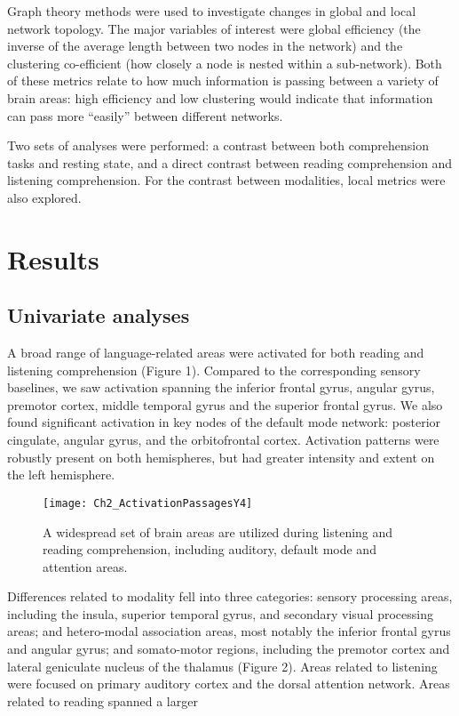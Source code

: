 Graph theory methods were used to investigate changes in global and local network topology. The major variables of interest were global efficiency (the inverse of the average length between two nodes in the network) and the clustering co-efficient (how closely a node is nested within a sub-network). Both of these metrics relate to how much information is passing between a variety of brain areas: high efficiency and low clustering would indicate that information can pass more “easily” between different networks. 

Two sets of analyses were performed: a contrast between both comprehension tasks and resting state, and a direct contrast between reading comprehension and listening comprehension. For the contrast between modalities, local metrics were also explored.

\section{Results}

\subsection{Univariate analyses}
A broad range of language-related areas were activated for both reading and listening comprehension (Figure 1). Compared to the corresponding sensory baselines, we saw activation spanning the inferior frontal gyrus, angular gyrus, premotor cortex, middle temporal gyrus and the superior frontal gyrus. We also found significant activation in key nodes of the default mode network: posterior cingulate, angular gyrus, and the orbitofrontal cortex. Activation patterns were robustly present on both hemispheres, but had greater intensity and extent on the left hemisphere. 

\begin{figure}[tp]
\centering
\texttt{[image: Ch2\_ActivationPassagesY4]}
    \caption[Language comprehension spans many brain areas.]{A widespread set of brain areas are utilized during listening and reading comprehension, including auditory, default mode and attention areas.}
\label{fig:ch2_passages}
\end{figure}

Differences related to modality fell into three categories: sensory processing areas, including the insula, superior temporal gyrus, and secondary visual processing areas; and hetero-modal association areas, most notably the inferior frontal gyrus and angular gyrus; and somato-motor regions, including the premotor cortex and lateral geniculate nucleus of the thalamus (Figure 2). Areas related to listening were focused on primary auditory cortex and the dorsal attention network. Areas related to reading spanned a larger 

